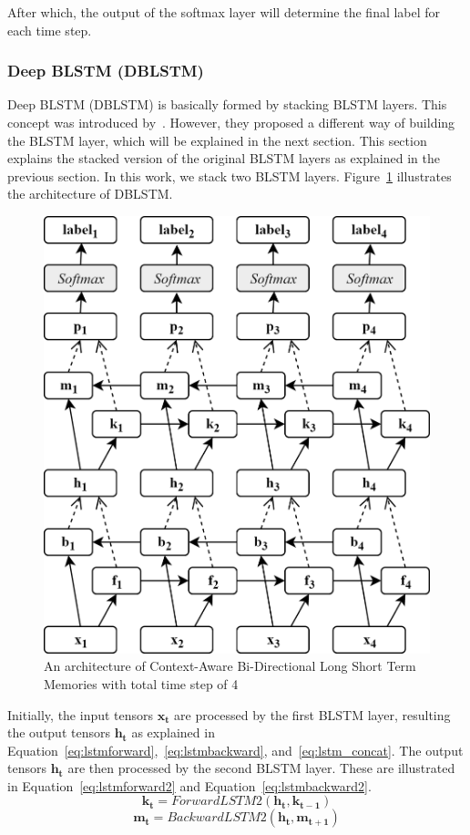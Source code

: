 After which, the output of the softmax layer will determine the final label for each time step.

\subsubsection{Deep BLSTM (DBLSTM)}
Deep BLSTM (DBLSTM) is basically formed by stacking BLSTM layers. This concept was introduced by~\cite{zhou2015end}. However, they proposed a different way of building the BLSTM layer, which will be explained in the next section. This section explains the stacked version of the original BLSTM layers as explained in the previous section. In this work, we stack two BLSTM layers. Figure~\ref{fig:dblstm} illustrates the architecture of DBLSTM.

\begin{figure}
	\centering
	\includegraphics[width=0.75\linewidth]{images/dblstm}
	\caption{An architecture of Context-Aware Bi-Directional Long Short Term Memories with total time step of 4}
	\label{fig:dblstm}
\end{figure}

Initially, the input tensors $\mathbf{x_{t}}$ are processed by the first BLSTM layer, resulting the output tensors $\mathbf{h_{t}}$ as explained in Equation~\ref{eq:lstmforward},~\ref{eq:lstmbackward}, and~\ref{eq:lstm_concat}. The output tensors $\mathbf{h_{t}}$ are then processed by the second BLSTM layer. These are illustrated in Equation~\ref{eq:lstmforward2} and Equation~\ref{eq:lstmbackward2}.
\begin{equation}
\label{eq:lstmforward2}
\mathbf{k_{t}} = ForwardLSTM2(\mathbf{h_{t}}, \mathbf{k_{t-1}})
\end{equation}
\begin{equation}
\label{eq:lstmbackward2}
\mathbf{m_{t}} = BackwardLSTM2(\mathbf{h_{t}}, \mathbf{m_{t+1}})
\end{equation}

